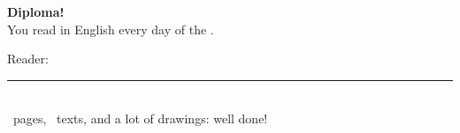 \begin{center}
\vspace*{2.6cm}

{\fontsize{60}{60}\selectfont\color{colorCrea}\icoEstrella}

\vspace{9mm}
{\fontsize{34}{40}\selectfont\bfseries\color{colorLectura} Diploma!}\\[8mm]
{\Large You read in English every day of the .}\\[10mm]
{\Large Reader: \rule{65mm}{0.4pt}}\\[14mm]
{\large \totaldias\ pages, \totaldias\ texts, and a lot of drawings: well done!}
\end{center}
\vspace*{\fill}
\newpage

